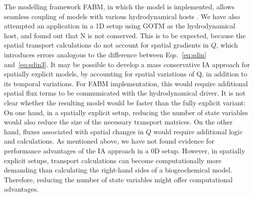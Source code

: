 \documentclass[gmd, manuscript]{copernicus}
\begin{document}
The modelling framework FABM, in which the model is implemented, allows seamless coupling of models with various hydrodynamical hosts \citep{Bruggeman2014}. We have also attempted an application in a 1D setup using GOTM \citep{Burchard2006} as the hydrodynamical host, and found out that N is not conserved. This is to be expected, because the spatial transport calculations do not account for spatial gradients in $Q$, which introduces errors analogous to the difference between Eqs.~\eqref{eq:sdin} and~\eqref{eq:sdin3}.  It may be possible to develop a mass conservative IA approach for spatially explicit models, by accounting for spatial variations of Q, in addition to its temporal variations. For FABM implementation, this would require additional spatial flux terms to be communicated with the hydrodynamical driver. It is not clear whether the resulting model would be faster than the fully explicit variant: On one hand, in a spatially explicit setup, reducing the number of state variables would also reduce the size of the necessary transport matrices.  On the other hand, fluxes associated with spatial changes in $Q$ would require additional logic and calculations. As mentioned above, we have not found evidence for performance advantages of the IA approach in a 0D setup. However, in spatially explicit setups, transport calculations can become computationally more demanding than calculating the right-hand sides of a biogeochemical model.  Therefore, reducing the number of state variables might offer computational advantages.

\end{document}

